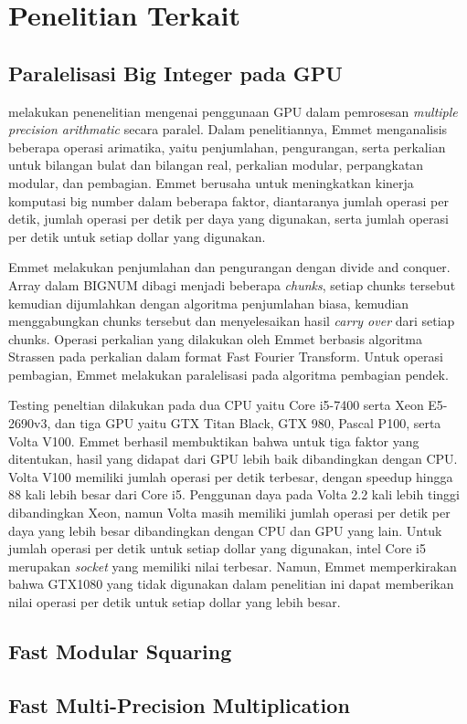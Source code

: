 \section{Penelitian Terkait}
\subsection{Paralelisasi Big Integer pada GPU}
\citet{gpu_bignum} melakukan penenelitian mengenai penggunaan GPU dalam pemrosesan \textit{multiple precision arithmatic} secara paralel. Dalam penelitiannya, Emmet menganalisis beberapa operasi arimatika, yaitu penjumlahan, pengurangan, serta perkalian untuk bilangan bulat dan bilangan real, perkalian modular, perpangkatan modular, dan pembagian. Emmet berusaha untuk meningkatkan kinerja komputasi big number dalam beberapa faktor, diantaranya jumlah operasi per detik, jumlah operasi per detik per daya yang digunakan, serta jumlah operasi per detik untuk setiap dollar yang digunakan.

Emmet melakukan penjumlahan dan pengurangan dengan divide and conquer. Array dalam BIGNUM dibagi menjadi beberapa \textit{chunks}, setiap chunks tersebut kemudian dijumlahkan dengan algoritma penjumlahan biasa, kemudian menggabungkan chunks tersebut dan menyelesaikan hasil \textit{carry over} dari setiap chunks. Operasi perkalian yang dilakukan oleh Emmet berbasis algoritma Strassen pada perkalian dalam format Fast Fourier Transform. Untuk operasi pembagian, Emmet melakukan paralelisasi pada algoritma pembagian pendek.


Testing peneltian dilakukan pada dua CPU yaitu Core i5-7400 serta Xeon E5-2690v3, dan tiga GPU yaitu GTX Titan Black, GTX 980, Pascal P100, serta Volta V100. Emmet berhasil membuktikan bahwa untuk tiga faktor yang ditentukan, hasil yang didapat dari GPU lebih baik dibandingkan dengan CPU. Volta V100 memiliki jumlah operasi per detik terbesar, dengan speedup hingga 88 kali lebih besar dari Core i5. Penggunan daya pada Volta 2.2 kali lebih tinggi dibandingkan Xeon, namun Volta masih memiliki jumlah operasi per detik per daya yang lebih besar dibandingkan dengan CPU dan GPU yang lain. Untuk jumlah operasi per detik untuk setiap dollar yang digunakan, intel Core i5 merupakan \textit{socket} yang memiliki nilai terbesar. Namun, Emmet memperkirakan bahwa GTX1080 yang tidak digunakan dalam penelitian ini dapat memberikan nilai operasi per detik untuk setiap dollar yang lebih besar.

\subsection{Fast Modular Squaring}
\citep{drucker_gueron_2019}

\subsection{Fast Multi-Precision Multiplication}
\citep{hutter_wenger_2018}


